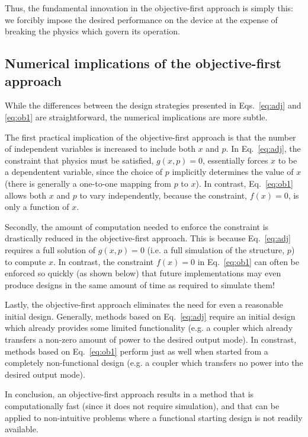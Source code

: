 \documentclass[letterpaper,10pt]{article}
\begin{document}
Thus, the fundamental innovation in the objective-first approach
    is simply this:
    we forcibly impose the desired performance on the device at the expense of
    breaking the physics which govern its operation.

\subsection{Numerical implications of the objective-first approach}

While the differences between the design strategies presented in 
    Eqs.~\ref{eq:adj} and \ref{eq:ob1} are straightforward,
    the numerical implications are more subtle.

The first practical implication of the objective-first approach 
    is that the number of independent variables is increased to include
    both $x$ and $p$.
In Eq.~\ref{eq:adj}, the constraint that physics must be satisfied, $g(x,p)=0$, 
    essentially forces $x$ to be a dependentent variable,
    since the choice of $p$ implicitly determines the value of $x$
    (there is generally a one-to-one mapping from $p$ to $x$).
In contrast, Eq.~\ref{eq:ob1} allows both $x$ and $p$ to vary independently,
    because the constraint, $f(x)=0$, is only a function of $x$.

Secondly, the amount of computation needed to enforce the constraint is
    drastically reduced in the objective-first approach.
This is because Eq.~\ref{eq:adj} requires a full solution of $g(x,p)=0$
    (i.e. a full simulation of the structure, $p$) to compute $x$.
In contrast, the constraint $f(x)=0$ in Eq.~\ref{eq:ob1} 
    can often be enforced so quickly (as shown below) that 
    future implementations may even produce designs in the same amount of time
    as required to simulate them!

Lastly, the objective-first approach eliminates the need for even a reasonable
    initial design.
Generally, methods based on Eq.~\ref{eq:adj} require an initial design which
    already provides some limited functionality
    (e.g. a coupler which already transfers 
    a non-zero amount of power to the desired output mode).
In constrast, methods based on Eq.~\ref{eq:ob1} perform just as well
    when started from a completely non-functional design 
    (e.g. a coupler which transfers no power into the desired output mode).

In conclusion, an objective-first approach results in a method 
    that is computationally fast (since it does not require simulation), and
    that can be applied to non-intuitive problems 
    where a functional starting design is not readily available.
\end{document}
